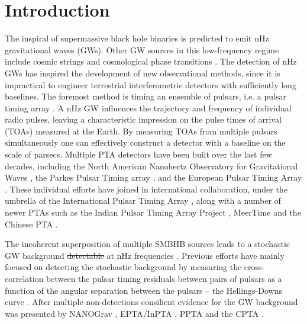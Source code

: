 \documentclass[fleqn,usenatbib,useAMS]{mnras}
\providecommand{\DIFdel}[1]{{\protect\color{red}\sout{#1}}}                      %
\providecommand{\DIFdelbegin}{} %
\providecommand{\DIFdelend}{} %
\newcommand{\DIFscaledelfig}{0.5}
\newlength{\DIFdelgraphicswidth} %
\newlength{\DIFdelgraphicsheight} %
\newcommand{\DIFdelincludegraphics}[2][]{%
\sbox{\DIFdelgraphicsbox}{\DIFOincludegraphics[#1]{#2}}%
\settoboxwidth{\DIFdelgraphicswidth}{\DIFdelgraphicsbox} %
\settoboxtotalheight{\DIFdelgraphicsheight}{\DIFdelgraphicsbox} %
\scalebox{\DIFscaledelfig}{%
\parbox[b]{\DIFdelgraphicswidth}{\usebox{\DIFdelgraphicsbox}\\[-\baselineskip] \rule{\DIFdelgraphicswidth}{0em}}\llap{\resizebox{\DIFdelgraphicswidth}{\DIFdelgraphicsheight}{%
\setlength{\unitlength}{\DIFdelgraphicswidth}%
\begin{picture}(1,1)%
\thicklines\linethickness{2pt} %
{\color[rgb]{1,0,0}\put(0,0){\framebox(1,1){}}}%
{\color[rgb]{1,0,0}\put(0,0){\line( 1,1){1}}}%
{\color[rgb]{1,0,0}\put(0,1){\line(1,-1){1}}}%
\end{picture}%
}\hspace*{3pt}}} %
} %
\DeclareRobustCommand{\DIFdelbegin}{\DIFOdelbegin \let\includegraphics\DIFdelincludegraphics} %
\DeclareRobustCommand{\DIFdelend}{\DIFOaddend \let\includegraphics\DIFOincludegraphics} %
\begin{document}
\begingroup
\let\clearpage\relax
\endgroup
\newpage
\section{Introduction}\label{sec:intro}
The inspiral of supermassive black hole binaries \citep[SMBHBs;][]{Rajagopal1995,Jaffe_2003, Wyithe2003,Sesana2013,McWilliams_2014,Ravi2015MNRAS.447.2772R,Burke2019, Skyes2022} is predicted to emit nHz gravitational waves (GWs). Other GW sources in this low-frequency regime include cosmic strings \citep[e.g.][]{PTAstring} and cosmological phase transitions \citep[e.g.][]{PTAphase}. The detection of nHz GWs has inspired the development of new observational methods, since it is impractical to engineer terrestrial interferometric detectors with sufficiently long baselines. The foremost method is timing an ensemble of pulsars, i.e. a pulsar timing array \citep[PTA;][]{ Tiburzi2018, 2021hgwa.bookE...4V}. A nHz GW influences the trajectory and frequency of individual radio pulses, leaving a characteristic impression on the pulse times of arrival (TOAs) measured at the  Earth. By measuring TOAs from multiple pulsars simultaneously one can effectively construct a detector with a baseline on the scale of parsecs. Multiple PTA detectors have been built over the last few decades, including the North American Nanohertz Observatory for Gravitational Waves \citep[NANOGrav,][]{NANOgrav2023}, the Parkes Pulsar Timing array \citep[PPTA,][]{Parkes2023}, and the European Pulsar Timing Array \citep[EPTA,][]{EPTA2023}. These individual efforts have joined in international collaboration, under the umbrella of the International Pulsar Timing Array \citep[IPTA,][]{2019MNRAS.490.4666P}, along with a number of newer PTAs such as the Indian Pulsar Timing Array Project \citep[InPTA,][]{ipta}, MeerTime \citep{meertime2,Meertime} and the Chinese PTA \citep[CPTA,][]{Hobbs_2019}. \newline 

The incoherent superposition of multiple SMBHB sources leads to a stochastic GW background \DIFdelbegin \DIFdel{detectable }\DIFdelend at nHz frequencies \citep{Allen1997,Sesana10,Christensen2019,Renzini2022}. Previous efforts have mainly focused on detecting the stochastic background by measuring the cross-correlation between the pulsar timing residuals between pairs of pulsars as a function of the angular separation between the pulsars -- the Hellings-Downs curve \citep{Hellings}. After multiple non-detections \citep{Lentati2015,NanoGrav2018,2022MNRAS.510.4873A} consilient evidence for the GW background was presented by NANOGrav \citep{2023ApJ...951L...8A}, EPTA/InPTA \citep{2023arXiv230616214A}, PPTA \citep{2023ApJ...951L...6R} and the CPTA \citep{2023RAA....23g5024X}. \newline 
\end{document}
